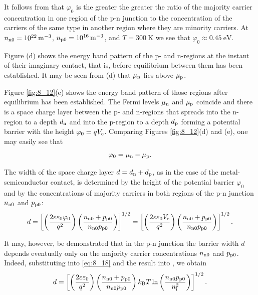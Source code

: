 It follows from  that $\varphi_0$ is the greater the greater the ratio of the majority carrier concentration in one region of the p-n junction to the concentration of the carriers of the same type in another region where they are minority carriers. At $n_{\text{n$0$}}=\SI{e22}{\per\metre\cubed}$, $n_{\text{p$0$}}=\SI{e16}{\per\metre\cubed}$, and $T=\SI{300}{\kelvin}$ we see that $\varphi_0\approx\SI{0.45}{\electronvolt}$.

Figure (d) shows the energy band pattern of the p- and n-regions at the instant of their imaginary contact, that is, before equilibrium between them has been established. It may be seen from (d) that $\mu_{\text{n}}$ lies above $\mu_{\text{p}}$.

Figure \ref{fig:8_12}(e) shows the energy band pattern of those regions after equilibrium has been established. The Fermi levels $\mu_{\text{n}}$ and $\mu_{\text{p}}$ coincide and there is a space charge layer between the p- and n-regions that spreads into the n-region to a depth $d_{\text{n}}$ and into the p-region to a depth $d_{\text{p}}$ forming a potential barrier with the height $\varphi_0=qV_{\text{c}}$. Comparing Figures \ref{fig:8_12}(d) and (e), one may easily see that
\begin{equation}\label{eq:8_19}
	\varphi_0 = \mu_{\text{n}} - \mu_{\text{p}}.
\end{equation}

\noindent
The width of the space charge layer $d=d_{\text{n}}+d_{\text{p}}$, as in the case of the metal-semiconductor contact, is determined by the height
of the potential barrier $\varphi_0$ and by the concentrations of majority carriers in both regions of the p-n junction $n_{\text{n$0$}}$ and $p_{\text{p$0$}}$:
\begin{equation}\label{eq:8_20}
	d = \left[\left(\frac{2\varepsilon\varepsilon_0\varphi_0}{q^2}\right) \left(\frac{n_{\text{n$0$}} + p_{\text{p$0$}}}{n_{\text{n$0$}}p_{\text{p$0$}}}\right)\right]^{1/2} = \left[\left(\frac{2\varepsilon\varepsilon_0V_{\text{c}}}{q^2}\right) \left(\frac{n_{\text{n$0$}} + p_{\text{p$0$}}}{n_{\text{n$0$}}p_{\text{p$0$}}}\right)\right]^{1/2}.
\end{equation}

It may, however, be demonstrated that in the p-n junction the barrier width $d$ depends eventually only on the majority carrier concentrations $n_{\text{n$0$}}$ and $p_{\text{p$0$}}$. Indeed, substituting  into \eqref{eq:8_18} and the result into , we obtain
\begin{equation*}
	d = \left[\left(\frac{2\varepsilon\varepsilon_0}{q^2}\right) \left(\frac{n_{\text{n$0$}} + p_{\text{p$0$}}}{n_{\text{n$0$}}p_{\text{p$0$}}}\right) k_{\text{B}}T \ln\left(\frac{n_{\text{n$0$}}p_{\text{p$0$}}}{n_{\text{i}}^2}\right)\right]^{1/2}.
\end{equation*}

